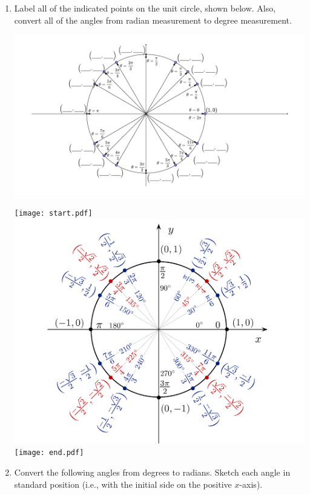 \documentclass[12pt]{article}
\begin{document}
\begin{enumerate}

\item Label all of the indicated points on the unit circle, shown below.  Also, convert all of the angles from radian measurement to degree measurement.

\begin{center}
\includegraphics[scale=0.8]{unitcircle4.pdf}
\end{center}

\texttt{[image: start.pdf]}
{{\includegraphics[scale=0.5]{unit_circle.pdf}}}
\texttt{[image: end.pdf]}


\newpage

\item Convert the following angles from degrees to radians.  Sketch each angle in standard position (i.e., with the initial side on the positive $x$-axis).


\end{enumerate}
\end{document}
